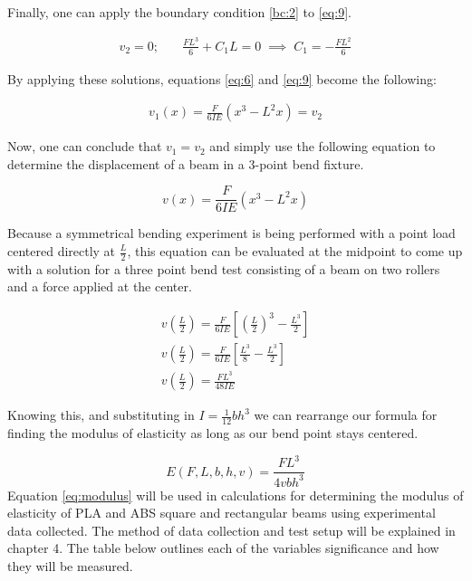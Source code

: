 Finally, one can apply the boundary condition \eqref{bc:2} to \eqref{eq:9}.

\begin{align*}
v_2 = 0; & \quad \frac{FL^3}{6} + C_1L = 0 \; \implies \; C_1 = -\frac{FL^2}{6}
\end{align*}

By applying these solutions, equations \eqref{eq:6} and \eqref{eq:9} become the following:

\begin{align*}
v_1(x) = \frac{F}{6IE}(x^3 - L^2x) = v_2
\end{align*}

Now, one can conclude that $v_1 = v_2$ and simply use the following equation to determine the displacement of a beam in a 3-point bend fixture.

\begin{equation} \label{eq:10}
v(x) = \frac{F}{6IE}(x^3 - L^2x)
\end{equation}

Because a symmetrical bending experiment is being performed with a point load centered directly at $\frac{L}{2}$, this equation can be evaluated at the midpoint to come up with a solution for a three point bend test consisting of a beam on two rollers and a force applied at the center.

\begin{align}
v\left(\frac{L}{2}\right) = \frac{F}{6IE}\left[\left(\frac{L}{2}\right)^3 - \frac{L^3}{2}\right] \nonumber \\
v\left(\frac{L}{2}\right) = \frac{F}{6IE}\left[\frac{L^3}{8} - \frac{L^3}{2}\right] \nonumber \\
\label{eq:v} v\left(\frac{L}{2}\right) = \frac{FL^3}{48IE}
\end{align}

Knowing this, and substituting in $I = \frac{1}{12}bh^3$ we can rearrange our formula for finding the modulus of elasticity as long as our bend point stays centered.

\begin{equation}\label{eq:modulus}
E(F,L,b,h,v) = \frac{FL^3}{4vbh^3}
\end{equation}
Equation \eqref{eq:modulus} will be used in calculations for determining the modulus of elasticity of PLA and ABS square and rectangular beams using experimental data collected. The method of data collection and test setup will be explained in chapter 4. The table below outlines each of the variables significance and how they will be measured.

